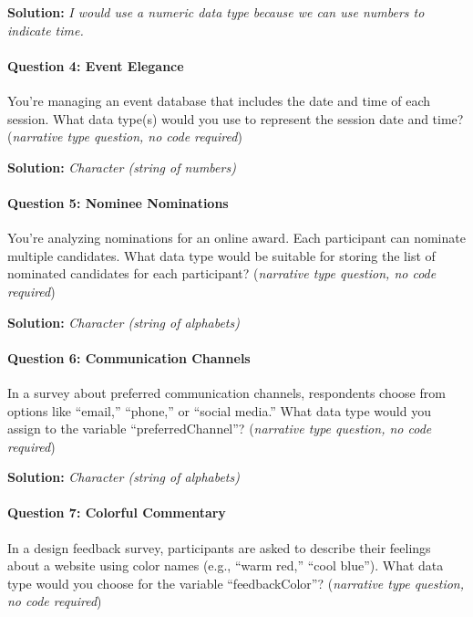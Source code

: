 \documentclass[
]{article}
\begin{document}
\textbf{Solution:} \emph{I would use a numeric data type because we can
use numbers to indicate time.}

\hypertarget{question-4-event-elegance}{%
\paragraph{Question 4: Event Elegance}\label{question-4-event-elegance}}

You're managing an event database that includes the date and time of
each session. What data type(s) would you use to represent the session
date and time? (\emph{narrative type question, no code required})

\textbf{Solution:} \emph{Character (string of numbers)}

\hypertarget{question-5-nominee-nominations}{%
\paragraph{Question 5: Nominee
Nominations}\label{question-5-nominee-nominations}}

You're analyzing nominations for an online award. Each participant can
nominate multiple candidates. What data type would be suitable for
storing the list of nominated candidates for each participant?
(\emph{narrative type question, no code required})

\textbf{Solution:} \emph{Character (string of alphabets)}

\hypertarget{question-6-communication-channels}{%
\paragraph{Question 6: Communication
Channels}\label{question-6-communication-channels}}

In a survey about preferred communication channels, respondents choose
from options like ``email,'' ``phone,'' or ``social media.'' What data
type would you assign to the variable ``preferredChannel''?
(\emph{narrative type question, no code required})

\textbf{Solution:} \emph{Character (string of alphabets)}

\hypertarget{question-7-colorful-commentary}{%
\paragraph{Question 7: Colorful
Commentary}\label{question-7-colorful-commentary}}

In a design feedback survey, participants are asked to describe their
feelings about a website using color names (e.g., ``warm red,'' ``cool
blue''). What data type would you choose for the variable
``feedbackColor''? (\emph{narrative type question, no code required})
\end{document}
